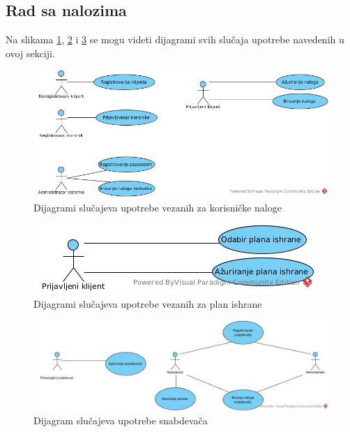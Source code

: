 \subsection{Rad sa nalozima}

Na slikama \ref{fig:UCUserAccounts}, \ref{fig:UCMealPlan} i \ref{fig:UCSupplierAccounts} se mogu videti dijagrami svih slučaja upotrebe navedenih u ovoj sekciji.

\begin{figure}[H]
\begin{center}
\includegraphics[width=\textwidth]{Pictures/uc_user_accounts.png}
\end{center}
    \caption{Dijagrami slučajeva upotrebe vezanih za korisničke naloge}
\label{fig:UCUserAccounts}
\end{figure}

\begin{figure}[H]
\begin{center}
\includegraphics[width=\textwidth]{Pictures/uc_meal_plan.png}
\end{center}
    \caption{Dijagrami slučajeva upotrebe vezanih za plan ishrane}
\label{fig:UCMealPlan}
\end{figure}

\begin{figure}[H]
\begin{center}
\includegraphics[width=\textwidth]{Pictures/uc_supplier.jpg}
\end{center}
    \caption{Dijagram slučajeva upotrebe snabdevača}
\label{fig:UCSupplierAccounts}
\end{figure}

